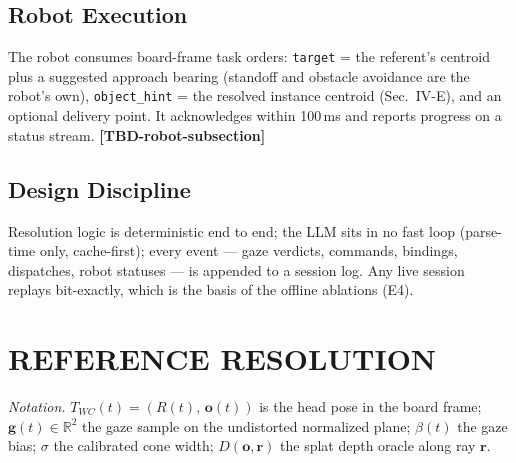 \documentclass[letterpaper, 10 pt, conference]{ieeeconf}  %
\newcommand{\TBD}[1]{\textbf{\color{red}[TBD-#1]}}
\begin{document}
\subsection{Robot Execution}
The robot consumes board-frame task orders: \texttt{target} = the
referent's centroid plus a suggested approach bearing (standoff and
obstacle avoidance are the robot's own), \texttt{object\_hint} = the
resolved instance centroid (Sec.~IV-E), and an optional delivery
point. It acknowledges within 100\,ms and reports progress on a
status stream. \TBD{robot-subsection}

\subsection{Design Discipline}
Resolution logic is deterministic end to end; the LLM sits in no fast
loop (parse-time only, cache-first); every event --- gaze verdicts,
commands, bindings, dispatches, robot statuses --- is appended to a
session log. Any live session replays bit-exactly, which is the basis
of the offline ablations (E4).


\section{REFERENCE RESOLUTION}
\emph{Notation.} $T_{WC}(t)=(R(t),\,\mathbf{o}(t))$ is the head pose
in the board frame; $\mathbf{g}(t)\in\mathbb{R}^2$ the gaze sample on
the undistorted normalized plane; $\beta(t)$ the gaze bias; $\sigma$
the calibrated cone width; $D(\mathbf{o},\mathbf{r})$ the splat depth
oracle along ray $\mathbf{r}$.
\end{document}
